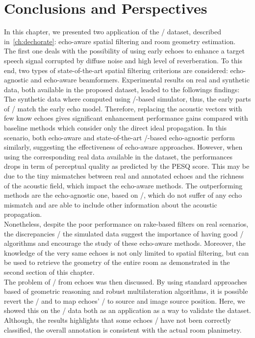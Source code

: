 \section{Conclusions and Perspectives}\label{sec:dechorateapp:conclusion}
In this chapter, we presented two application of the \DECHORATE/ dataset, described in~\cref{ch:dechorate}: echo-aware spatial filtering and room geometry estimation.
\\The first one deals with the possibility of using early echoes to enhance a target speech signal corrupted by diffuse noise and high level of reverberation.
To this end, two types of state-of-the-art spatial filtering criterions are considered: echo-agnostic and echo-aware beamformers.
Experimental results on real and synthetic data, both available in the proposed dataset, leaded to the followings findings:
The synthetic data where computed using \ISM/-based simulator, thus, the early parts of \RIRs/ match the early echo model.
Therefore, replacing the acoustic vectors with few know echoes gives significant enhancement performance gains compared with baseline methods which consider only the direct ideal propagation.
In this scenario, both echo-aware and state-of-the-art \ReTF/-based echo-agnostic perform similarly, suggesting the effectiveness of echo-aware approaches.
However, when using the corresponding real data available in the dataset, the performances drops in term of perceptual quality as predicted by the \acs{PESQ} score.
This may be due to the tiny mismatches between real and annotated echoes and the richness of the acoustic field, which impact the echo-aware methods.
The outperforming methods are the echo-agnostic one, based on \ReTF/, which do not suffer of any echo mismatch and are able to include other information about the acoustic propagation.
\\Nonetheless, despite the poor performance on rake-based filters on real scenarios, the discrepancies \wrt/ the simulated data suggest the importance of having good \AER/ algorithms and encourage the study of these echo-aware methods.
Moreover, the knowledge of the very same echoes is not only limited to spatial filtering, but can be used to retrieve the geometry of the entire room as demonstrated in the second section of this chapter.
\\The problem of \RooGEdef/ from echoes was then discussed.
By using standard approaches based of geometric reasoning and robust multilateration algorithms, it is possible revert the \ISM/ and to map echoes' \TOAs/ to source and image source position.
Here, we showed this on the \DECHORATE/ data both as an application as a way to validate the dataset.
Although, the results highlights that some echoes \TOAs/ have not been correctly classified, the overall annotation is consistent with the actual room planimetry.


